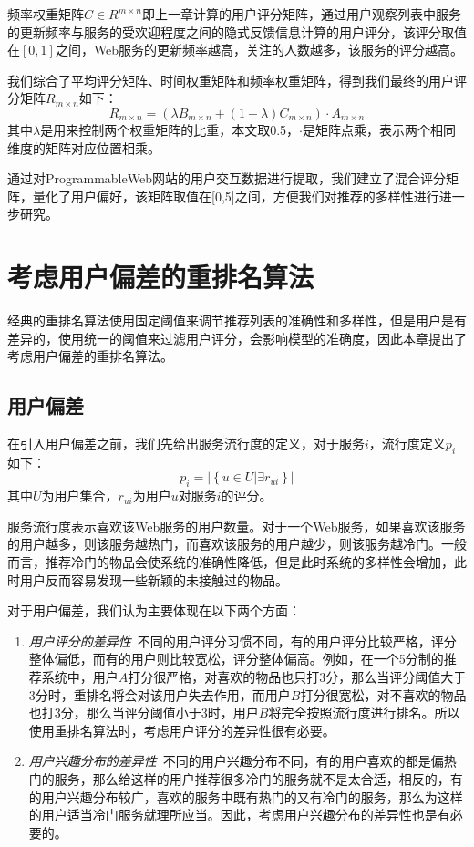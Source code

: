 \documentclass[master,winfonts]{njuthesis}
\begin{document}
频率权重矩阵$C \in R^{m \times n}$即上一章计算的用户评分矩阵，通过用户观察列表中服务的更新频率与服务的受欢迎程度之间的隐式反馈信息计算的用户评分，该评分取值在$\left [0,1 \right ]$之间，Web服务的更新频率越高，关注的人数越多，该服务的评分越高。

我们综合了平均评分矩阵、时间权重矩阵和频率权重矩阵，得到我们最终的用户评分矩阵$R_{m \times n}$如下：
\begin{equation}
R_{m \times n} = (\lambda B_{m \times n}+(1-\lambda) C_{m \times n})\cdot A_{m \times n}\label{eq:4-2}
\end{equation}
其中$\lambda$是用来控制两个权重矩阵的比重，本文取0.5，$\cdot$是矩阵点乘，表示两个相同维度的矩阵对应位置相乘。

通过对ProgrammableWeb网站的用户交互数据进行提取，我们建立了混合评分矩阵，量化了用户偏好，该矩阵取值在[0,5]之间，方便我们对推荐的多样性进行进一步研究。

\section{考虑用户偏差的重排名算法}
经典的重排名算法使用固定阈值来调节推荐列表的准确性和多样性，但是用户是有差异的，使用统一的阈值来过滤用户评分，会影响模型的准确度，因此本章提出了考虑用户偏差的重排名算法。
\subsection{用户偏差}
在引入用户偏差之前，我们先给出服务流行度的定义，对于服务$i$，流行度定义$p_i$如下：
\begin{equation}
p_i = \left | \left \{ u \in U|\exists r_{ui}\right \} \right |
\end{equation}
其中$U$为用户集合，$r_{ui}$为用户$u$对服务$i$的评分。

服务流行度表示喜欢该Web服务的用户数量。对于一个Web服务，如果喜欢该服务的用户越多，则该服务越热门，而喜欢该服务的用户越少，则该服务越冷门。一般而言，推荐冷门的物品会使系统的准确性降低，但是此时系统的多样性会增加，此时用户反而容易发现一些新颖的未接触过的物品\cite{钟足峰2017可提高多样性的基于重排序图书推荐算法研究}。

对于用户偏差，我们认为主要体现在以下两个方面：

\begin{enumerate}
\item \emph{用户评分的差异性}~不同的用户评分习惯不同，有的用户评分比较严格，评分整体偏低，而有的用户则比较宽松，评分整体偏高。例如，在一个5分制的推荐系统中，用户$A$打分很严格，对喜欢的物品也只打3分，那么当评分阈值大于3分时，重排名将会对该用户失去作用，而用户$B$打分很宽松，对不喜欢的物品也打3分，那么当评分阈值小于3时，用户$B$将完全按照流行度进行排名。所以使用重排名算法时，考虑用户评分的差异性很有必要。

\item \emph{用户兴趣分布的差异性}~不同的用户兴趣分布不同，有的用户喜欢的都是偏热门的服务，那么给这样的用户推荐很多冷门的服务就不是太合适，相反的，有的用户兴趣分布较广，喜欢的服务中既有热门的又有冷门的服务，那么为这样的用户适当冷门服务就理所应当。因此，考虑用户兴趣分布的差异性也是有必要的。
\end{enumerate}
\end{document}
